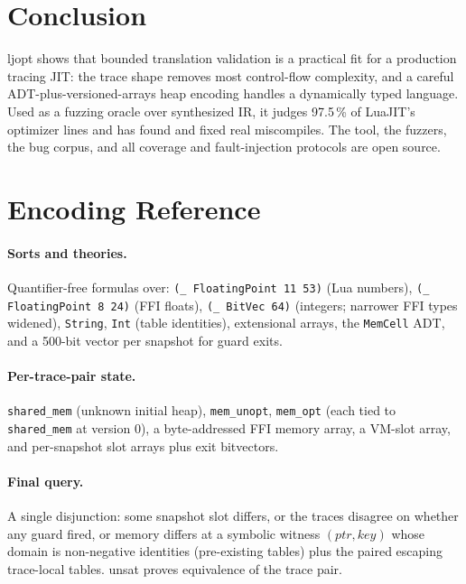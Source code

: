 \documentclass[runningheads]{llncs}
\newif\iffull \fulltrue
\newif\ifarxiv
\newcommand{\ljopt}{\textsf{ljopt}}
\begin{document}
\iffull
\section{Conclusion}
\else
\paragraph{Conclusion.}
\fi
\ljopt{} shows that bounded translation validation is a practical fit for a
production tracing JIT: the trace shape removes most control-flow
complexity, and a careful ADT-plus-versioned-arrays heap encoding handles a
dynamically typed language. Used as a fuzzing oracle over synthesized IR,
it judges 97.5\,\% of LuaJIT's optimizer lines and has found and fixed real
miscompiles. The tool, the fuzzers, the bug corpus, and all coverage and
fault-injection protocols are open source.


\ifarxiv
\appendix
\section{Encoding Reference}\label{app:encoding}

\paragraph{Sorts and theories.} Quantifier-free formulas over:
\texttt{(\_ FloatingPoint 11 53)} (Lua numbers), \texttt{(\_ FloatingPoint
8 24)} (FFI floats), \texttt{(\_ BitVec 64)} (integers; narrower FFI types
widened), \texttt{String}, \texttt{Int} (table identities), extensional
arrays, the \texttt{MemCell} ADT, and a 500-bit vector per snapshot for
guard exits.

\paragraph{Per-trace-pair state.}
\texttt{shared\_mem} (unknown initial heap), \texttt{mem\_unopt},
\texttt{mem\_opt} (each tied to \texttt{shared\_mem} at version 0), a
byte-addressed FFI memory array, a VM-slot array, and per-snapshot slot
arrays plus exit bitvectors.

\paragraph{Final query.} A single disjunction: some snapshot slot differs,
or the traces disagree on whether any guard fired, or memory differs at a
symbolic witness $(\mathit{ptr}, \mathit{key})$ whose domain is
non-negative identities (pre-existing tables) plus the paired escaping
trace-local tables. \textsf{unsat} proves equivalence of the trace pair.
\end{document}
